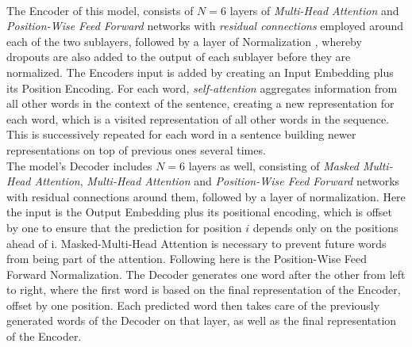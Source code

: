 \documentclass[a4paper, 11pt,titlepage,oneside,openany]{book}
\begin{document}
\\The Encoder of this model, consists of $N=6$ layers of \textit{Multi-Head Attention} and \textit{Position-Wise Feed Forward} networks with \textit{residual connections} \cite{residualcon} employed around each of the two sublayers, followed by a layer of Normalization \cite{normalization}, whereby dropouts \cite{dopout} are also added to the output of each sublayer before they are normalized. The Encoders input is added by creating an Input Embedding plus its Position Encoding. For each word, \textit{self-attention} aggregates information from all other words in the context of the sentence, creating a new representation for each word, which is a visited representation of all other words in the sequence. This is successively repeated for each word in a sentence  building newer representations on top of previous ones several times.\\
\noindent The model's Decoder includes $N=6$ layers as well, consisting of \textit{Masked Multi-Head Attention}, \textit{Multi-Head Attention} and \textit{Position-Wise Feed Forward} networks with residual connections around them, followed by a layer of normalization. Here the input is the Output Embedding plus its positional encoding, which is offset by one to ensure that the prediction for position $i$ depends only on the positions ahead of i. Masked-Multi-Head Attention is necessary to prevent future words from being part of the attention. Following here is the Position-Wise Feed Forward Normalization. The Decoder generates one word after the other from left to right, where the first word is based on the final representation of the Encoder, offset by one position. Each predicted word then takes care of the previously generated words of the Decoder on that layer, as well as the final representation of the Encoder.
\end{document}
